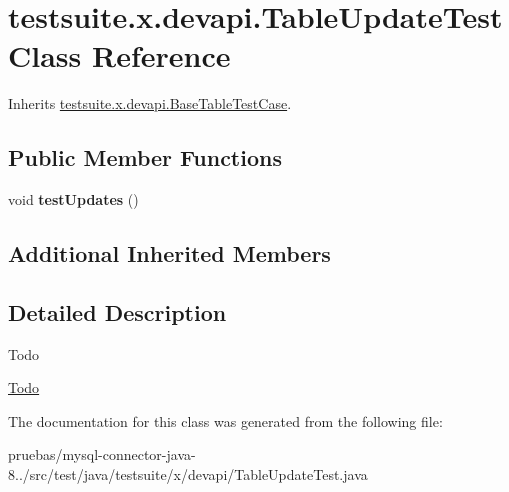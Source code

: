 \hypertarget{classtestsuite_1_1x_1_1devapi_1_1_table_update_test}{}\section{testsuite.\+x.\+devapi.\+Table\+Update\+Test Class Reference}
\label{classtestsuite_1_1x_1_1devapi_1_1_table_update_test}


Inherits \mbox{\hyperlink{classtestsuite_1_1x_1_1devapi_1_1_base_table_test_case}{testsuite.\+x.\+devapi.\+Base\+Table\+Test\+Case}}.

\subsection*{Public Member Functions}
\begin{DoxyCompactItemize}
\item 
\mbox{\label{classtestsuite_1_1x_1_1devapi_1_1_table_update_test_a9c5a9b20e5be89b307d8c85bb498addf}} 
void {\bfseries test\+Updates} ()
\end{DoxyCompactItemize}
\subsection*{Additional Inherited Members}


\subsection{Detailed Description}
\begin{DoxyRefDesc}{Todo}
\item[\mbox{\hyperlink{todo__todo000012}{Todo}}]\end{DoxyRefDesc}


The documentation for this class was generated from the following file\+:\begin{DoxyCompactItemize}
\item 
pruebas/mysql-\/connector-\/java-\/8../src/test/java/testsuite/x/devapi/Table\+Update\+Test.\+java\end{DoxyCompactItemize}

